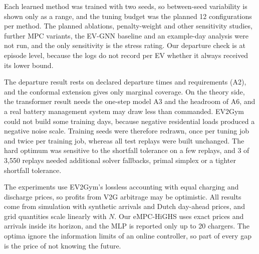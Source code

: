 Each learned method was trained with two seeds, so between-seed variability is shown only as a range, and the tuning budget was the planned 12 configurations per method.
The planned ablations, penalty-weight and other sensitivity studies, further MPC variants, the EV-GNN baseline and an example-day analysis were not run, and the only sensitivity is the stress rating.
Our departure check is at episode level, because the logs do not record per EV whether it always received its lower bound.

The departure result rests on declared departure times and requirements (A2), and the conformal extension gives only marginal coverage.
On the theory side, the transformer result needs the one-step model A3 and the headroom of A6, and a real battery management system may draw less than commanded.
EV2Gym could not build some training days, because negative residential loads produced a negative noise scale.
Training seeds were therefore redrawn, once per tuning job and twice per training job, whereas all test replays were built unchanged.
The hard optimum was sensitive to the shortfall tolerance on a few replays, and 3 of 3,550 replays needed additional solver fallbacks, primal simplex or a tighter shortfall tolerance.

The experiments use EV2Gym's lossless accounting with equal charging and discharge prices, so profits from V2G arbitrage may be optimistic.
All results come from simulation with synthetic arrivals and Dutch day-ahead prices, and grid quantities scale linearly with $N$.
Our eMPC-HiGHS uses exact prices and arrivals inside its horizon, and the MLP is reported only up to 20 chargers.
The optima ignore the information limits of an online controller, so part of every gap is the price of not knowing the future.
